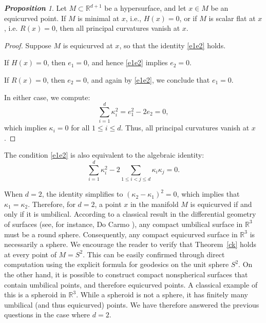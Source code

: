 \documentclass{amsart}
\theoremstyle{Theorem}
\theoremstyle{remark}
\newtheorem{prop}{\bf Proposition}[section]
\numberwithin{equation}{section} \numberwithin{figure}{section}
\begin{document}
\begin{prop}
Let \( M \subset \mathbb{R}^{d+1} \) be a hypersurface, and let \( x \in M \) be an equicurved point. If \( M \) is minimal at \( x \), i.e., \( H(x) = 0 \), or if \( M \) is scalar flat at \( x \), i.e. \( R(x) = 0 \), then all principal curvatures vanish at \( x \).
\end{prop}
\begin{proof}
Suppose \( M \) is equicurved at \( x \), so that the identity \eqref{e1e2} holds.

If \( H(x) = 0 \), then \( e_1 = 0 \), and hence \eqref{e1e2} implies \( e_2 = 0 \).

If \( R(x) = 0 \), then \( e_2 = 0 \), and again by \eqref{e1e2}, we conclude that \( e_1 = 0 \).

In either case, we compute:
\[
\sum_{i=1}^d \kappa_i^2 = e_1^2 - 2e_2 = 0,
\]
which implies \( \kappa_i = 0 \) for all \( 1 \leq i \leq d \). Thus, all principal curvatures vanish at \( x \).
\end{proof}



The condition \eqref{e1e2} is also equivalent to the algebraic identity:
\begin{equation}\label{ele3}
\sum_{i=1}^{d} \kappa_i^2 - 2 \sum_{1 \leq i < j \leq d} \kappa_i \kappa_j = 0.
\end{equation}


When \( d = 2 \), the identity simplifies to \( (\kappa_2 - \kappa_1)^2 = 0 \), which implies that \(\kappa_1 = \kappa_2 \). Therefore, for \( d = 2 \), a point \( x \) in the manifold \( M \) is equicurved if and only if it is umbilical. According to a classical result in the differential geometry of surfaces (see, for instance, Do Carmo  \cite{C}), any compact umbilical surface in \( \mathbb{R}^3 \) must be a round sphere. Consequently, any compact equicurved surface in \( \mathbb{R}^3 \) is necessarily a sphere.
We encourage the reader to verify that Theorem~\ref{ck} holds at every point of \( M = S^2 \). This can be easily confirmed through direct computation using the explicit formula for geodesics on the unit sphere \( S^2 \).
On the other hand, it is possible to construct compact nonspherical surfaces that contain umbilical points, and therefore equicurved points. A classical example of this is a spheroid in \( \mathbb{R}^3 \). While a spheroid is not a sphere, it has finitely many umbilical (and thus equicurved) points.
We have therefore answered the previous questions in the case where \( d = 2 \).
\end{document}

